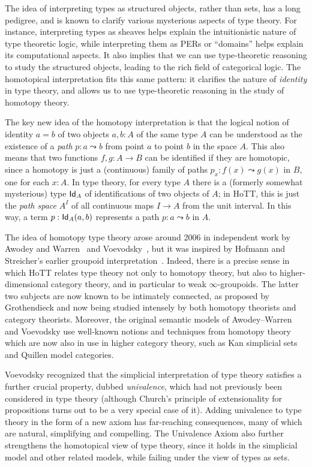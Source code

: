 {The idea of interpreting types as structured objects, rather than sets, has a long pedigree, and is known to clarify various mysterious aspects of type theory.
For instance, interpreting types as sheaves helps explain the intuitionistic nature of type theoretic logic, while interpreting them as PERs or ``domains'' helps explain its computational aspects.
It also implies that we can use type-theoretic reasoning to study the structured objects, leading to the rich field of categorical logic.
The homotopical interpretation fits this same pattern: it clarifies the nature of \emph{identity} in type theory, and allows us to use type-theoretic reasoning in the study of homotopy theory.

The key new idea of the homotopy interpretation is that the logical notion of identity $a = b$ of two objects $a, b: A$ of the same type $A$ can be understood as the existence of a \emph{path} $p : a \leadsto b$ from point $a$ to point $b$ in the space $A$.  This also means that two functions $f, g: A\to B$ can be identified if they are homotopic, since a homotopy is just a (continuous) family of paths $p_x: f(x) \leadsto g(x)$ in $B$, one for each $x:A$.  In type theory, for every type $A$ there is a (formerly somewhat mysterious) type ${{\sf Id}}_{A}$ of identifications of two objects of $A$; in HoTT, this is just the \emph{path space} $A^I$ of all continuous maps $I\to A$ from the unit interval.  In this way, a term $p : {{\sf Id}}_{A}(a,b)$ represents a path $p : a \leadsto b$ in $A$. 

The idea of homotopy type theory arose around 2006 in independent work by Awodey and Warren~\cite{AW} and Voevodsky~\cite{VV}, but it was inspired by 
Hofmann and Streicher's earlier groupoid interpretation~\cite{HofmannM:gromtt}.
Indeed, there is a precise sense in which HoTT relates type theory not only to homotopy theory, but also to higher-dimensional category theory, and in particular to weak $\infty$-groupoids.
The latter two subjects are now known to be intimately connected, as proposed by Grothendieck and now being studied intensely by both homotopy theorists and category theorists.
Moreover, the original semantic models of Awodey--Warren and Voevodsky use well-known notions and techniques from homotopy theory which are now also in use in higher category theory, such as Kan simplicial sets and Quillen model categories.

Voevodsky recognized that the simplicial interpretation of type theory satisfies a further crucial property, dubbed \emph{univalence}, which had not previously been considered in type theory (although Church's principle of extensionality for propositions turns out to be a very special case of it).
Adding univalence to type theory in the form of a new axiom has far-reaching consequences, many of which are natural, simplifying and compelling.
The Univalence Axiom also further strengthens the homotopical view of type theory, since it holds in the simplicial model and other related models, while failing under the view of types as sets.

}

